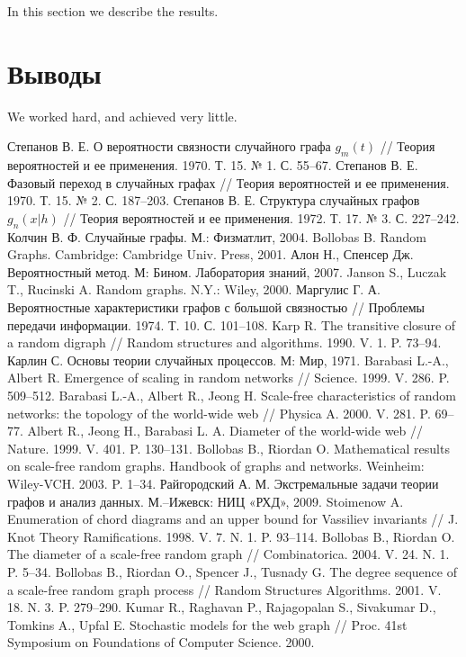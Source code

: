 \documentclass[14pt]{extreport}
\begin{document}
In this section we describe the results.

\section{Выводы}
We worked hard, and achieved very little.


%
\begin{thebibliography}{9}

\bibitem{}
Степанов В. Е. О вероятности связности случайного графа $g_m(t)$ // Теория вероятностей и ее применения. 1970. Т. 15. № 1. С. 55–67.
\bibitem{}
Степанов В. Е. Фазовый переход в случайных графах // Теория вероятностей и ее применения. 1970. Т. 15. № 2. С. 187–203.
\bibitem{}
Степанов В. Е. Структура случайных графов $g_n(x|h)$ // Теория вероятностей и ее применения. 1972. Т. 17. № 3. С. 227–242.
\bibitem{}
Колчин В. Ф. Случайные графы. М.: Физматлит, 2004.
\bibitem{}
Bollobas B. Random Graphs. Cambridge: Cambridge Univ. Press, 2001.
\bibitem{}
Алон Н., Спенсер Дж. Вероятностный метод. М: Бином. Лаборатория знаний, 2007.
\bibitem{}
Janson S., Luczak T., Rucinski A. Random graphs. N.Y.: Wiley, 2000.
\bibitem{}
Маргулис Г. А. Вероятностные характеристики графов с большой связностью // Проблемы передачи информации. 1974. Т. 10. С. 101–108.
\bibitem{}
Karp R. The transitive closure of a random digraph // Random structures and algorithms. 1990. V. 1. P. 73–94.
\bibitem{}
Карлин С. Основы теории случайных процессов. М: Мир, 1971.
\bibitem{}
Barabasi L.-A., Albert R. Emergence of scaling in random networks // Science. 1999. V. 286. P. 509–512.
\bibitem{}
Barabasi L.-A., Albert R., Jeong H. Scale-free characteristics of random networks: the topology of the world-wide web // Physica A. 2000. V. 281. P. 69–77.
\bibitem{}
Albert R., Jeong H., Barabasi L. A. Diameter of the world-wide web // Nature. 1999. V. 401. P. 130–131.
\bibitem{}
Bollobas B., Riordan O. Mathematical results on scale-free random graphs. Handbook of graphs and networks. Weinheim: Wiley-VCH. 2003. P. 1–34.
\bibitem{}
Райгородский А. М. Экстремальные задачи теории графов и анализ данных. М.–Ижевск: НИЦ «РХД», 2009.
\bibitem{}
Stoimenow A. Enumeration of chord diagrams and an upper bound for Vassiliev invariants // J. Knot Theory Ramifications. 1998. V. 7. N. 1. P. 93–114.
\bibitem{}
Bollobas B., Riordan O. The diameter of a scale-free random graph // Combinatorica. 2004. V. 24. N. 1. P. 5–34.
\bibitem{}
Bollobas B., Riordan O., Spencer J., Tusnady G. The degree sequence of a scale-free random graph process // Random Structures Algorithms. 2001. V. 18. N. 3. P. 279–290.
\bibitem{}
Kumar R., Raghavan P., Rajagopalan S., Sivakumar D., Tomkins A., Upfal E. Stochastic models for the web graph // Proc. 41st Symposium on Foundations of Computer Science. 2000.

\end{thebibliography}
\newpage
\end{document}
